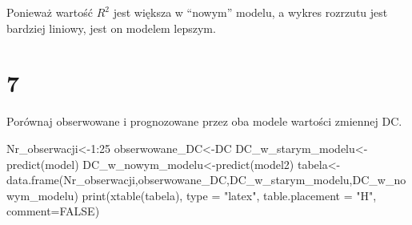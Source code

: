 \documentclass[
  12pt,
]{article}
\newenvironment{Shaded}{\begin{snugshade}}{\end{snugshade}}
\newcommand{\AttributeTok}[1]{\textcolor[rgb]{0.77,0.63,0.00}{#1}}
\newcommand{\ConstantTok}[1]{\textcolor[rgb]{0.00,0.00,0.00}{#1}}
\newcommand{\DecValTok}[1]{\textcolor[rgb]{0.00,0.00,0.81}{#1}}
\newcommand{\FunctionTok}[1]{\textcolor[rgb]{0.00,0.00,0.00}{#1}}
\newcommand{\NormalTok}[1]{#1}
\newcommand{\OtherTok}[1]{\textcolor[rgb]{0.56,0.35,0.01}{#1}}
\newcommand{\SpecialCharTok}[1]{\textcolor[rgb]{0.00,0.00,0.00}{#1}}
\newcommand{\StringTok}[1]{\textcolor[rgb]{0.31,0.60,0.02}{#1}}
\begin{document}
Ponieważ wartość \(R^{2}\) jest większa w ``nowym'' modelu, a wykres
rozrzutu jest bardziej liniowy, jest on modelem lepszym.

\hypertarget{section-6}{%
\section{7}\label{section-6}}

Porównaj obserwowane i prognozowane przez oba modele wartości zmiennej
DC.

\begin{Shaded}
\begin{Highlighting}[]
\NormalTok{Nr\_obserwacji}\OtherTok{\textless{}{-}}\DecValTok{1}\SpecialCharTok{:}\DecValTok{25}
\NormalTok{obserwowane\_DC}\OtherTok{\textless{}{-}}\NormalTok{DC}
\NormalTok{DC\_w\_starym\_modelu}\OtherTok{\textless{}{-}}\FunctionTok{predict}\NormalTok{(model)}
\NormalTok{DC\_w\_nowym\_modelu}\OtherTok{\textless{}{-}}\FunctionTok{predict}\NormalTok{(model2)}
\NormalTok{tabela}\OtherTok{\textless{}{-}}\FunctionTok{data.frame}\NormalTok{(Nr\_obserwacji,obserwowane\_DC,DC\_w\_starym\_modelu,DC\_w\_nowym\_modelu)}
\FunctionTok{print}\NormalTok{(}\FunctionTok{xtable}\NormalTok{(tabela), }\AttributeTok{type =} \StringTok{"latex"}\NormalTok{, }\AttributeTok{table.placement =} \StringTok{"H"}\NormalTok{, }\AttributeTok{comment=}\ConstantTok{FALSE}\NormalTok{)}
\end{Highlighting}
\end{Shaded}
\end{document}
